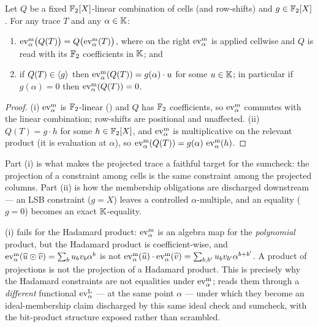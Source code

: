 \begin{lemma}
\label{lem:linear-survives}
Let $Q$ be a fixed $\mathbb{F}_2[X]$-linear combination of cells (and row-shifts)
and $g\in\mathbb{F}_2[X]$. For any trace $T$ and any $\alpha\in\mathbb{K}$:
\begin{enumerate}[leftmargin=2em,label=(\roman*)]
  \item $\operatorname{ev}^{\mathrm{m}}_{\alpha}\bigl(Q(T)\bigr) = Q\bigl(\operatorname{ev}^{\mathrm{m}}_{\alpha}(T)\bigr)$, where on the right
    $\operatorname{ev}^{\mathrm{m}}_{\alpha}$ is applied cellwise and $Q$ is read with its $\mathbb{F}_2$
    coefficients in $\mathbb{K}$; and
  \item if $Q(T)\in\langle g \rangle$ then $\operatorname{ev}^{\mathrm{m}}_{\alpha}(Q(T)) = g(\alpha)\cdot u$ for
    some $u\in\mathbb{K}$; in particular if $g(\alpha)=0$ then $\operatorname{ev}^{\mathrm{m}}_{\alpha}(Q(T))=0$.
\end{enumerate}
\end{lemma}

\begin{proof}
(i) $\operatorname{ev}^{\mathrm{m}}_{\alpha}$ is $\mathbb{F}_2$-linear () and $Q$ has $\mathbb{F}_2$
coefficients, so $\operatorname{ev}^{\mathrm{m}}_{\alpha}$ commutes with the linear combination; row-shifts
are positional and unaffected. (ii) $Q(T)=g\cdot h$ for some $h\in\mathbb{F}_2[X]$,
and $\operatorname{ev}^{\mathrm{m}}_{\alpha}$ is multiplicative on the relevant product (it is evaluation at
$\alpha$), so $\operatorname{ev}^{\mathrm{m}}_{\alpha}(Q(T)) = g(\alpha)\,\operatorname{ev}^{\mathrm{m}}_{\alpha}(h)$.
\end{proof}

Part (i) is what makes the projected trace a faithful target for the
sumcheck: the projection of a constraint among cells is the same
constraint among the projected columns. Part (ii) is how the membership
obligations are discharged downstream --- an
LSB constraint ($g=X$) leaves a controlled $\alpha$-multiple, and an
equality ($g=0$) becomes an exact $\mathbb{K}$-equality.

\begin{remark}
\label{rem:and-not-survive}
(i) fails for the Hadamard product: $\operatorname{ev}^{\mathrm{m}}_{\alpha}$ is
an algebra map for the \emph{polynomial} product, but the Hadamard product
is coefficient-wise, and $\operatorname{ev}^{\mathrm{m}}_{\alpha}(\widehat{u}\odot\widehat{v}) = \sum_b u_b v_b\alpha^b$
is not $\operatorname{ev}^{\mathrm{m}}_{\alpha}(\widehat{u})\cdot\operatorname{ev}^{\mathrm{m}}_{\alpha}(\widehat{v}) = \sum_{b,b'} u_b v_{b'}\alpha^{b+b'}$.
A product of projections is not the projection of a Hadamard product. This
is precisely why the Hadamard constraints are not equalities under $\operatorname{ev}^{\mathrm{m}}_{\alpha}$;
 reads them through a \emph{different} functional $\operatorname{ev}^{\mathrm{L}}_{\alpha}$
--- at the same point $\alpha$ --- under which they become an
ideal-membership claim discharged by this same ideal check and sumcheck,
with the bit-product structure exposed rather than scrambled.
\end{remark}

